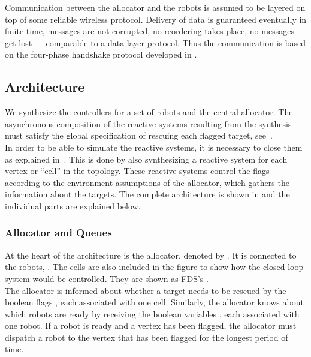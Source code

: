 Communication between the allocator and the robots is assumed to be layered on top of some reliable wireless protocol. Delivery of data is guaranteed eventually in finite time, messages are not corrupted, no reordering takes place, no messages get lost --- comparable to a data-layer protocol. Thus the communication is based on the four-phase handshake protocol developed in .\\




\subsection{Architecture} \label{sec:statarch} 

We synthesize the controllers for a set of robots and the central allocator. The asynchronous composition of the reactive systems resulting from the synthesis must satisfy the global specification of rescuing each flagged target, see~.\\

In order to be able to simulate the reactive systems, it is necessary to close them as explained in~. This is done by also synthesizing a reactive system for each vertex or ``cell'' in the topology. These reactive systems control the flags according to the environment assumptions of the allocator, which gathers the information about the targets. The complete architecture is shown in  and the individual parts are explained below.\\




\subsubsection{Allocator and Queues}

At the heart of the architecture is the allocator, denoted by . It is connected to the robots, . The cells are also included in the figure to show how the closed-loop system would be controlled. They are shown as FDS's .\\

The allocator is informed about whether a target needs to be rescued by the boolean flags , each associated with one cell. Similarly, the allocator knows about which robots are ready by receiving the boolean variables , each associated with one robot. If a robot is ready and a vertex has been flagged, the allocator must dispatch a robot to the vertex that has been flagged for the longest period of time.\\

